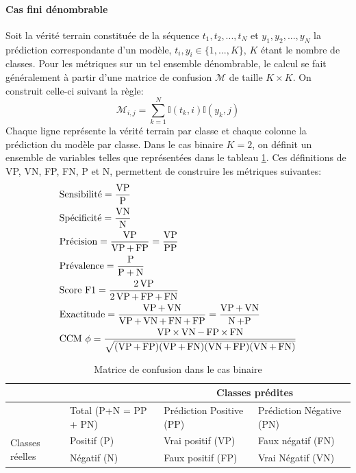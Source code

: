 \paragraph{Cas fini dénombrable}
Soit la vérité terrain constituée de la séquence $t_1, t_2, ..., t_N$ et $y_1, y_2, ..., y_N$ la prédiction correspondante d'un modèle, $t_i, y_i \in \{1, ..., K\}$, $K$ étant le nombre de classes. Pour les métriques sur un tel ensemble dénombrable, le calcul se fait généralement à partir d'une matrice de confusion $\mathcal{M}$ de taille $K\times K$. On construit celle-ci suivant la règle:
\begin{equation}
	\mathcal{M}_{i,j} = \sum_{k=1}^{N} \mathbb{I}(t_k, i)\mathbb{I}(y_k, j)		
\end{equation}
Chaque ligne représente la vérité terrain par classe et chaque colonne la prédiction du modèle par classe.
Dans le cas binaire $K=2$, on définit un ensemble de variables telles que représentées dans le tableau \ref{tab:BinaryConfusionMatrix}. Ces définitions de VP, VN, FP, FN, P et N, permettent de construire les métriques suivantes:
\begin{align}
	&\text{Sensibilité} =  \frac{\operatorname{VP}}{\text{P}} \\ 
	&\text{Spécificité} = \frac{\operatorname{VN}}{\operatorname{N}} \\ 
	&\text{Précision} = \frac{\operatorname{VP}}{\operatorname{VP} + \operatorname{FP}} =\frac{\operatorname{VP}}{\operatorname{PP}}\\ 
	&\text{Prévalence} = \frac{\text{P}}{\text{P} + \operatorname{N}}\\ 
	&\text{Score F1} = \frac{2\operatorname{VP}}{2\operatorname{VP} + \operatorname{FP} + \operatorname{FN}} \\ 
	&\text{Exactitude} = \frac{\operatorname{VP} + \operatorname{VN}}{\operatorname{VP} + \operatorname{VN} + \operatorname{FN} + \operatorname{FP}} =  \frac{\operatorname{VP} + \operatorname{VN}}{\operatorname{N} +\text{P}}\\ 
	&\text{CCM } \phi = \frac{\operatorname{VP} \times \operatorname{VN} - \operatorname{FP} \times \operatorname{FN}}{\sqrt{(\operatorname{VP} +\operatorname{FP})(\operatorname{VP} + \operatorname{FN})(\operatorname{VN} + \operatorname{FP})(\operatorname{VN} + \operatorname{FN})}}
\end{align}

\begin{table}[h]
	\caption{Matrice de confusion dans le cas binaire}
	\label{tab:BinaryConfusionMatrix}
	\centering
	\begin{tabular}{llll}
		\toprule
		\multicolumn{2}{l}{} & \multicolumn{2}{c}{\cellcolor{blue!10} Classes prédites}\\
		\midrule
		&Total  (P+N = PP + PN) & \cellcolor{blue!10} Prédiction Positive (PP) & \cellcolor{blue!10} Prédiction Négative (PN) \\
		\midrule[1pt]
		\multirow{2}{3em}{Classes réelles} & \cellcolor{yellow!20} Positif (P) & \cellcolor{green!15} Vrai positif (VP) & \cellcolor{red!15} Faux négatif (FN) \\
		& \cellcolor{yellow!20} Négatif (N) & \cellcolor{red!15} Faux positif (FP) & \cellcolor{green!15} Vrai Négatif (VN)\\
		\bottomrule		
	\end{tabular}
\end{table}

